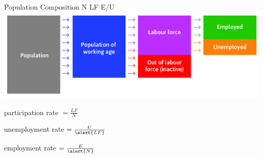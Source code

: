 \documentclass[11pt,aspectratio=169,usenames,dvipsnames]{beamer}
\let\tempone\itemize
\let\temptwo\enditemize
\renewenvironment{itemize}{\tempone\addtolength{\itemsep}{\fill}}{\temptwo}
\begin{document}
\begin{frame}{Population Composition}
\label{slide:Population_Composition}
    \hspace{11em} N \hspace{7em} LF \hspace{5em} E/U
    \includegraphics[width=\textwidth]{./figures/employmentPop.jpg}
    \begin{itemize}
        \item participation rate $ = \frac{LF}{N} $
        \item unemployment rate $ = \frac{U}{\alert{LF}} $
        \item employment rate $ = \frac{E}{\alert{N}} $
    \end{itemize}
\end{frame}


% 
% 
\end{document}
